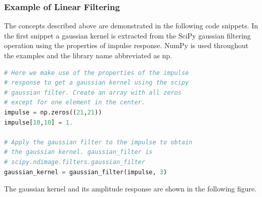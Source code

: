 \documentclass[]{article}
\begin{document}
\subsubsection{Example of Linear Filtering}
\label{example-of-linear-filtering}
The concepts described above are demonstrated in the following code snippets.
In the first snippet a gaussian kernel is extracted from the SciPy gaussian
filtering operation using the properties of impulse response. NumPy is used
throughout the examples and the library name abbreviated as np.

\begin{lstlisting}[language=Python]
# Here we make use of the properties of the impulse
# response to get a gaussian kernel using the scipy
# gaussian filter. Create an array with all zeros
# except for one element in the center.
impulse = np.zeros((21,21))
impulse[10,10] = 1.

# Apply the gaussian filter to the impulse to obtain
# the gaussian kernel. gaussian_filter is
# scipy.ndimage.filters.gaussian_filter
gaussian_kernel = gaussian_filter(impulse, 3)
\end{lstlisting}
The gaussian kernel and its amplitude response are shown in the following
figure.
\end{document}
